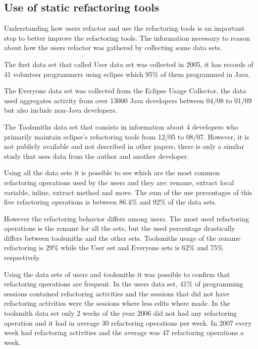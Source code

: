 
\subsection{Use of static refactoring tools}

Understanding how users refactor and use the refactoring tools is an important step to better improve the refactoring tools.
The information necessary to reason about how the users refactor was gathered by collecting some data sets.\cite{murphy2012we}


The first data set that called User data set was collected\cite{murphy2006java} in 2005, it has records of 41 volunteer programmers using eclipse which 95\% of them programmed in Java. %

The Everyone data set was collected from the Eclipse Usage Collector, the data used aggregates activity from over 13000 Java developers between 04/08 to 01/09 but also include non-Java developers.

The Toolsmiths data set that consists in information about 4 developers who primarily maintain eclipse's refactoring tools from 12/05 to 08/07. 
However, it is not publicly available and not described in other papers, there is only a similar study\cite{robbes2007mining} that uses data from the author and another developer. 


Using all the data sets it is possible to see which are the most common refactoring operations used by the users and they are: rename, extract local variable, inline, extract method and move. The sum of the use percentages of this five refactoring operations is between 86.4\% and 92\% of the data sets. %

However the refactoring behavior differs among users. The most used refactoring operations is the rename for all the sets, but the used percentage drastically differs between toolsmiths and the other sets. Toolsmiths usage of the rename refactoring is 29\% while the User set and Everyone sets is 62\% and 75\% respectively.

Using the data sets of users and toolsmiths it was possible to confirm that refactoring operations are frequent. 
In the users data set, 41\% of programming sessions contained refactoring activities and the sessions that did not have refactoring activities were the sessions where less edits where made.
In the toolsmith data set only 2 weeks of the year 2006 did not had any refactoring operation and it had in average 30 refactoring operations per week. 
In 2007 every week had refactoring activities and the average was 47 refactoring operations a week.

